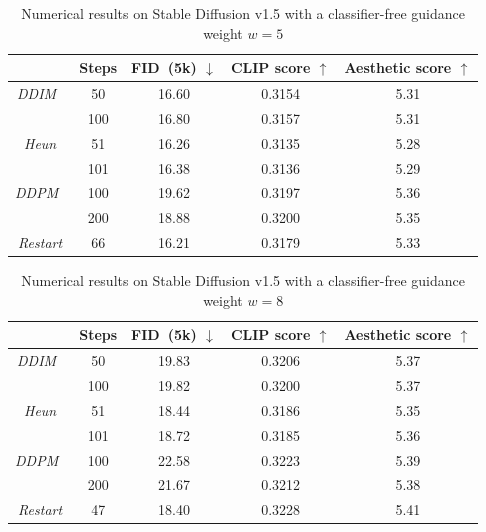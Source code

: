 \begin{table}[H]
    \centering
    \caption{Numerical results on Stable Diffusion v1.5 with a classifier-free guidance weight $w=5$}
    \begin{tabular}{c c c c c}
        \toprule
         & Steps & FID~(5k) $\downarrow$ & CLIP score $\uparrow$& Aesthetic score $\uparrow$ \\
          \midrule
\textit{DDIM}~\cite{Song2020DenoisingDI} 
    & 50 & 16.60 & 0.3154 & 5.31\\
    &100 & 16.80 & 0.3157 & 5.31\\
          \midrule
          \textit{Heun} & 51 & 16.26 & 0.3135 & 5.28\\
    &101 & 16.38 & 0.3136 & 5.29\\
    \midrule
\textit{DDPM}~\cite{Ho2020DenoisingDP} & 100 & 19.62 & 0.3197 & 5.36\\
        & 200 & 18.88 & 0.3200 & 5.35\\
        \midrule
        \textit{Restart} & 66 & 16.21 & 0.3179 & 5.33 \\
        \bottomrule
    \end{tabular}
    \label{tab:w=5}
\end{table}


\begin{table}[H]
    \centering
    \caption{Numerical results on Stable Diffusion v1.5 with a classifier-free guidance weight $w=8$}
    \begin{tabular}{c c c c c}
    \toprule
         & Steps & FID~(5k) $\downarrow$ & CLIP score $\uparrow$& Aesthetic score $\uparrow$ \\
          \midrule
\textit{DDIM}~\cite{Song2020DenoisingDI} 
    & 50 & 19.83 &   0.3206  & 5.37\\
    & 100 & 19.82 &   0.3200  & 5.37\\
          \midrule
\textit{Heun}
    & 51 & 18.44 &   0.3186  & 5.35\\
    & 101 & 18.72 &   0.3185  & 5.36\\
    \midrule
\textit{DDPM}~\cite{Ho2020DenoisingDP} & 100 & 22.58    & 0.3223 & 5.39\\
        & 200 & 21.67    & 0.3212 & 5.38\\
        \midrule
        \textit{Restart} & 47 & {18.40}& {0.3228} & {5.41} \\
        \bottomrule
    \end{tabular}
    \label{tab:w=8}
\end{table}

